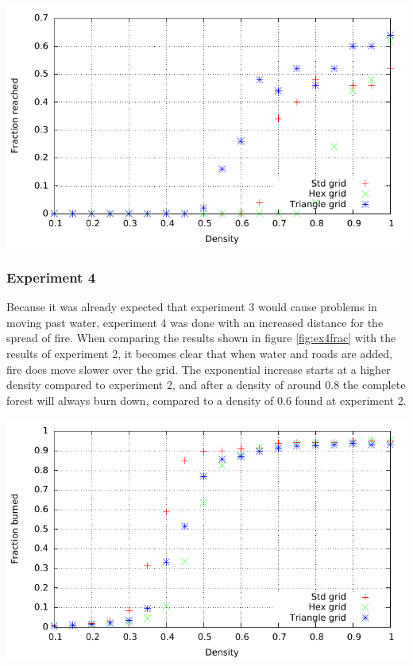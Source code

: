 \documentclass{article}
\newenvironment{Figure}
  {\par\medskip\noindent\minipage{\linewidth}}
  {\endminipage\par\medskip}
\begin{document}
\begin{multicols}{2}
\begin{Figure}
 \centering
 \includegraphics[width=\textwidth]{imgs/plot/ex3/oppreached.pdf}
\label{fig:ex3opp}
\end{Figure}
\subsubsection*{Experiment 4}
Because it was already expected that experiment 3 would cause problems in moving past water, experiment 4 was done with an increased distance for the spread of fire. When comparing the results shown in figure \ref{fig:ex4frac} with the results of experiment 2, it becomes clear that when water and roads are added, fire does move slower over the grid. The exponential increase starts at a higher density compared to experiment 2, and after a density of around 0.8 the complete forest will always burn down, compared to a density of 0.6 found at experiment 2.

\begin{Figure}
 \centering
 \includegraphics[width=\textwidth]{imgs/plot/ex4/fracburned.pdf}
\label{fig:ex4frac}
\end{Figure}

\end{multicols}
\end{document}
